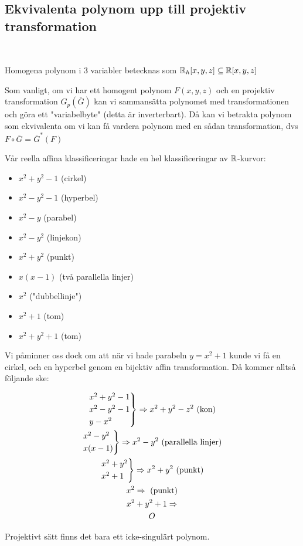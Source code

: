\subsection{Ekvivalenta polynom upp till projektiv transformation}\hfill\\\par
\noindent Homogena polynom i 3 variabler betecknas som $\mathbb{R}_h[x,y,z]\subseteq\mathbb{R}[x,y,z]$
\par\bigskip
\noindent Som vanligt, om vi har ett homogent polynom $F(x,y,z)$ och en projektiv transformation $G_p(\overline{G})$ kan vi sammansätta polynomet med transformationen och göra ett "variabelbyte" (detta är inverterbart). Då kan vi betrakta polynom som ekvivalenta om vi kan få vardera polynom med en sådan transformation, dvs $F\circ\overline{G} = \overline{G}^*(F)$
\par\bigskip
\noindent Vår reella affina klassificeringar hade en hel klassificeringar av $\mathbb{R}$-kurvor: 
\begin{itemize}
  \item $x^2+y^2-1$ (cirkel)
  \item $x^2-y^2-1$ (hyperbel)
  \item $x^2-y$ (parabel)
  \item $x^2-y^2$ (linjekon)
  \item $x^2+y^2$ (punkt)
  \item$x(x-1)$ (två parallella linjer)
  \item $x^2$ ("dubbellinje")
  \item $x^2+1$ (tom)
  \item $x^2+y^2+1$ (tom)
\end{itemize}
\par\bigskip
\noindent Vi påminner oss dock om att när vi hade parabeln $y=x^2+1$ kunde vi få en cirkel, och en hyperbel genom en bijektiv affin transformation. Då kommer alltså följande ske:\par
\begin{equation*}
  \begin{gathered}
    \begin{rcases*}
      x^2+y^2-1\\
      x^2-y^2-1\\
      y-x^2
    \end{rcases*}\Rightarrow x^2+y^2-z^2\text{ (kon)}\\
    \begin{rcases*}
      x^2-y^2\\
      x(x-1)
    \end{rcases*}\Rightarrow x^2-y^2\text{ (parallella linjer)}\\
    \begin{rcases*}
      x^2+y^2\\
      x^2+1
    \end{rcases*}\Rightarrow x^2+y^2 \text{ (punkt)}\\
    x^2\Rightarrow\text{ (punkt)}\\
    x^2+y^2+1\Rightarrow\\O
  \end{gathered}
\end{equation*}
\par\bigskip
\noindent Projektivt sätt finns det bara ett icke-singulärt polynom.
\par\bigskip
